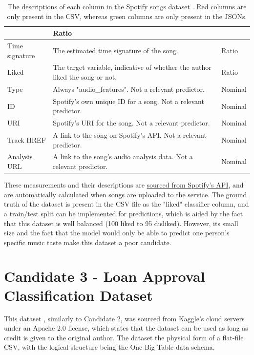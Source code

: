 \documentclass[12pt]{report}
\begin{document}
\begin{table}[H]
\begin{tabular}{ |p{}| p{}| p{}|}
            & Ratio\\
            \hline
            Time signature & The estimated time signature of the song.
            & Ratio\\
            \hline
            \cellcolor{red!15}Liked & The target variable, indicative of whether the author liked the song or not.
            & Ratio\\
            \hline
            \cellcolor{green!15}Type & Always "audio\_features". Not a relevant predictor.
            & Nominal\\
            \hline
            \cellcolor{green!15}ID & Spotify's own unique ID for a song. Not a relevant predictor.
            & Nominal\\
            \hline
            \cellcolor{green!15}URI & Spotify's URI for the song. Not a relevant predictor.
            & Nominal\\
            \hline
            \cellcolor{green!15}Track HREF & A link to the song on Spotify's API. Not a relevant predictor.
            & Nominal\\  
            \hline
            \cellcolor{green!15}Analysis URL & A link to the song's audio analysis data. Not a relevant predictor. 
            & Nominal\\
            \hline
    \end{tabular}
    \caption{The descriptions of each column in the Spotify songs dataset \autocite{spotify_web_nodate}. Red columns are only present in the CSV, whereas green columns are only present in the JSONs.}\label{tab:Spotify-Types}
\end{table}

These measurements and their descriptions are \href{https://developer.spotify.com/documentation/web-api/reference/get-audio-features}{sourced from Spotify's API},
and are automatically calculated when songs are uploaded to the service. The ground truth of the dataset is present in the CSV file as the "liked" classifier 
column, and a train/test split can be implemented for predictions, which is aided by the fact that this dataset is well balanced (100 liked to 95 disliked).
However, its small size and the fact that the model would only be able to predict one person's specific music taste make 
this dataset a poor candidate. 


\section{Candidate 3 - Loan Approval Classification Dataset}\label{sec:Dataset}
This dataset \autocite{lo_loan_nodate}, similarly to Candidate 2, was sourced from Kaggle's cloud servers under 
an Apache 2.0 license, which states that the dataset can be used as long as credit is given to the original author.
The dataset the physical form of a flat-file CSV, with the logical structure being the One Big Table data 
schema. 
\end{document}
